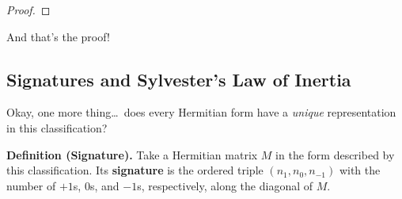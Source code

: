 \begin{proof}
    
\end{proof}

And that's the proof!


\subsection{Signatures and Sylvester's Law of Inertia}

Okay, one more thing\dots \ does every Hermitian form have a \emph{unique} representation in this classification?

\textbf{Definition (Signature).} Take a Hermitian matrix $M$ in the form described by this classification.  Its \textbf{signature} is the ordered triple $(n_1, n_0, n_{-1})$ with the number of $+1$s, $0$s, and $-1$s, respectively, along the diagonal of $M$.

